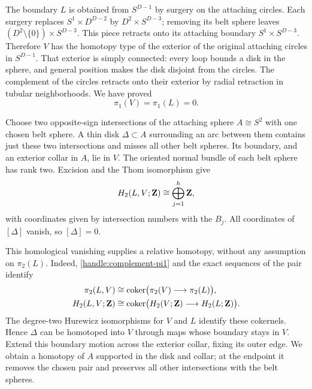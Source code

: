 The boundary $L$ is obtained from $S^{D-1}$ by surgery on the attaching
circles.  Each surgery replaces $S^1\times D^{D-2}$ by
$D^2\times S^{D-3}$; removing its belt sphere leaves
$(D^2\setminus\{0\})\times S^{D-3}$.
This piece retracts onto its attaching boundary
$S^1\times S^{D-3}$.  Therefore $V$ has the homotopy type of the
exterior of the original attaching circles in $S^{D-1}$.
That exterior is simply connected: every loop bounds a disk in the
sphere, and general position makes the disk disjoint from the circles.
The complement of the circles retracts onto their exterior by radial
retraction in tubular neighborhoods.  We have proved
\begin{equation}\label{handle:complement-pi1}
 \pi_1(V)=\pi_1(L)=0.
\end{equation}

Choose two opposite-sign intersections of the attaching sphere
$A\cong S^2$ with one chosen belt sphere.  A thin disk
$\Delta\subset A$ surrounding an arc between them contains just these
two intersections and misses all other belt spheres.  Its boundary,
and an exterior collar in $A$, lie in $V$.
The oriented normal bundle of each belt sphere has rank two.
Excision and the Thom isomorphism give
\begin{equation}\label{handle:intersection-group}
 H_2(L,V;\mathbf Z)\cong\bigoplus_{j=1}^h\mathbf Z,
\end{equation}
with coordinates given by intersection numbers with the $B_j$.
All coordinates of $[\Delta]$ vanish, so $[\Delta]=0$.

This homological vanishing supplies a relative homotopy, without any
assumption on $\pi_2(L)$.  Indeed, \eqref{handle:complement-pi1} and
the exact sequences of the pair identify
\begin{align*}
 \pi_2(L,V)&\cong
 \operatorname{coker}\bigl(\pi_2(V)\longrightarrow\pi_2(L)\bigr),\\
 H_2(L,V;\mathbf Z)&\cong
 \operatorname{coker}\bigl(H_2(V;\mathbf Z)\longrightarrow H_2(L;\mathbf Z)\bigr).
\end{align*}
The degree-two Hurewicz isomorphisms for $V$ and $L$ identify these
cokernels.  Hence $\Delta$ can be homotoped into $V$ through maps whose
boundary stays in $V$.  Extend this boundary motion across the exterior
collar, fixing its outer edge.  We obtain a homotopy of $A$ supported
in the disk and collar; at the endpoint it removes the chosen pair and
preserves all other intersections with the belt spheres.

